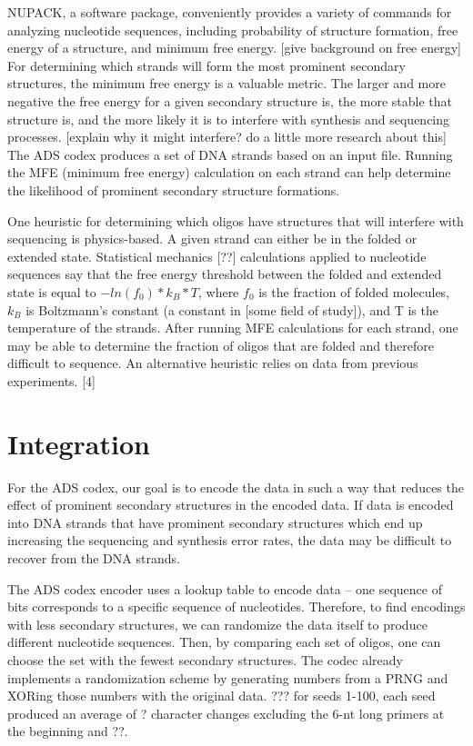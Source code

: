 \documentclass{article}
\begin{document}
NUPACK, a software package, conveniently provides a variety of commands for analyzing nucleotide sequences, including probability of structure formation, free energy of a structure, and minimum free energy. [give background on free energy] For determining which strands will form the most prominent secondary structures, the minimum free energy is a valuable metric. The larger and more negative the free energy for a given secondary structure is, the more stable that structure is, and the more likely it is to interfere with synthesis and sequencing processes. [explain why it might interfere? do a little more research about this] The ADS codex produces a set of DNA strands based on an input file. Running the MFE (minimum free energy) calculation on each strand can help determine the likelihood of prominent secondary structure formations.

One heuristic for determining which oligos have structures that will interfere with sequencing is physics-based. A given strand can either be in the folded or extended state. Statistical mechanics [??] calculations applied to nucleotide sequences say that the free energy threshold between the folded and extended state is equal to $-ln(f_0) * k_B * T$, where $f_0$ is the fraction of folded molecules, $k_B$ is Boltzmann’s constant (a constant in [some field of study]), and T is the temperature of the strands. After running MFE calculations for each strand, one may be able to determine the fraction of oligos that are folded and therefore difficult to sequence. An alternative heuristic relies on data from previous experiments. [4]

\section{Integration}

For the ADS codex, our goal is to encode the data in such a way that reduces the effect of prominent secondary structures in the encoded data. If data is encoded into DNA strands that have prominent secondary structures which end up increasing the sequencing and synthesis error rates, the data may be difficult to recover from the DNA strands. 

The ADS codex encoder uses a lookup table to encode data -- one sequence of bits corresponds to a specific sequence of nucleotides. Therefore, to find encodings with less secondary structures, we can randomize the data itself to produce different nucleotide sequences. Then, by comparing each set of oligos, one can choose the set with the fewest secondary structures. The codec already implements a randomization scheme by generating numbers from a PRNG and XORing those numbers with the original data. ??? for seeds 1-100, each seed produced an average of ? character changes excluding the 6-nt long primers at the beginning and ??. 
\end{document}

